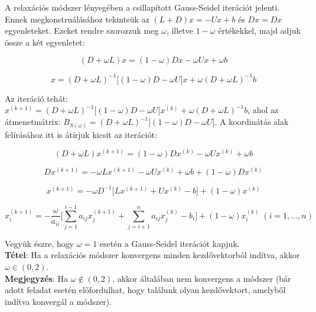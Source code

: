 \documentclass[margin=0px]{article}
\begin{document}
A relaxációs módszer lényegében a csillapított Gauss-Seidel iterációt jelenti. Ennek megkonstruálásához
tekintsük az $(L+D)x = -Ux + b$ és $Dx = Dx$ egyenleteket. Ezeket rendre szorozzuk meg $\omega$, illetve
$1 - \omega$ értékekkel, majd adjuk össze a két	egyenletet:

\begin{displaymath}
    (D+\omega L)x = (1 - \omega)Dx -\omega Ux + \omega b
\end{displaymath}

\begin{displaymath}
    x = (D+\omega L)^{-1}\big[(1 - \omega)D -\omega U \big]x + \omega (D+\omega L)^{-1}b
\end{displaymath}

Az iteráció tehát: $x^{(k+1)} = (D+\omega L)^{-1}\big[(1 - \omega)D -\omega U \big]x^{(k)} + \omega (D+\omega L)^{-1}b$, ahol
az átmenetmátrix: $B_{S(\omega)}= (D+\omega L)^{-1}\big[(1 - \omega)D -\omega U \big]$. A koordinátás alak
felírásához itt is átírjuk kicsit az iterációt:

\begin{displaymath}
    (D + \omega L)x^{(k+1)} = (1 - \omega)Dx^{(k)} -\omega Ux^{(k)} + \omega b
\end{displaymath}

\begin{displaymath}
    Dx^{(k+1)} =  -\omega Lx^{(k+1)} -\omega Ux^{(k)} + \omega b + (1 - \omega)Dx^{(k)}
\end{displaymath}

\begin{displaymath}
    x^{(k+1)} = -\omega D^{-1} \big[Lx^{(k+1)} + Ux^{(k)} - b \big] + (1 - \omega)x^{(k)}
\end{displaymath}

\begin{displaymath}
    x^{(k+1)}_{i} =
    -\frac{\omega}{a_{ii}}
    \Bigg[
    \sum_{j=1}^{i-1} a_{ij}x_{j}^{(k+1)} +
    \sum_{j=i+1}^{n} a_{ij}x_{j}^{(k)}	-
    b_{i}
    \Bigg] +
    (1 - \omega) x_{i}^{(k)}
    \; (i = 1, ..., n)
\end{displaymath}

\noindent Vegyük észre, hogy $\omega = 1$ esetén a Gauss-Seidel iterációt kapjuk.\\

\noindent \textbf{Tétel}: Ha a relaxációs módszer konvergens minden kezdővektorból indítva, akkor $\omega \in (0,2)$.\\

\noindent \textbf{Megjegyzés}: Ha $\omega \notin (0,2)$, akkor általában nem konvergens a módszer (bár adott feladat esetén előfordulhat,
hogy találunk olyan kezdővektort, amelyből indítva konvergál a módszer).\\
\end{document}
